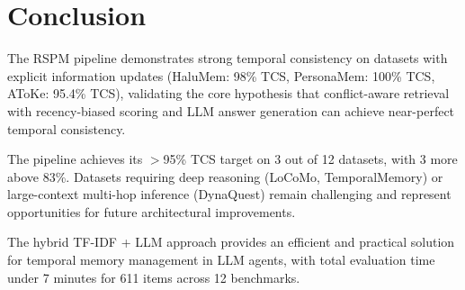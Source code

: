 \documentclass[11pt,a4paper]{article}
\begin{document}
\section{Conclusion}

The RSPM pipeline demonstrates strong temporal consistency on datasets with explicit information updates (HaluMem: 98\% TCS, PersonaMem: 100\% TCS, AToKe: 95.4\% TCS), validating the core hypothesis that conflict-aware retrieval with recency-biased scoring and LLM answer generation can achieve near-perfect temporal consistency.

The pipeline achieves its $>$95\% TCS target on 3 out of 12 datasets, with 3 more above 83\%. Datasets requiring deep reasoning (LoCoMo, TemporalMemory) or large-context multi-hop inference (DynaQuest) remain challenging and represent opportunities for future architectural improvements.

The hybrid TF-IDF + LLM approach provides an efficient and practical solution for temporal memory management in LLM agents, with total evaluation time under 7 minutes for 611 items across 12 benchmarks.
\end{document}
